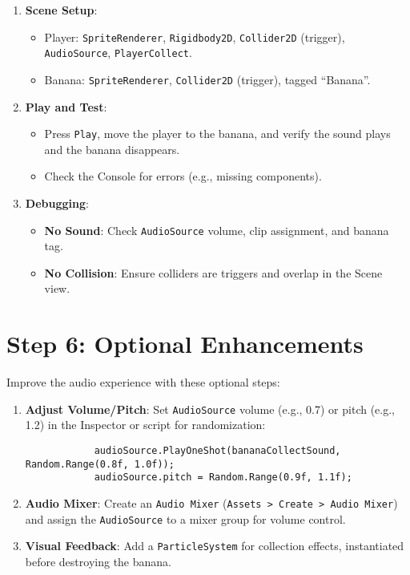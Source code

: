 \documentclass[a4paper,12pt]{article}
\begin{document}
	\begin{enumerate}[label=\arabic*.]
		\item \textbf{Scene Setup}:
		\begin{itemize}
			\item Player: \texttt{SpriteRenderer}, \texttt{Rigidbody2D}, \texttt{Collider2D} (trigger), \texttt{AudioSource}, \texttt{PlayerCollect}.
			\item Banana: \texttt{SpriteRenderer}, \texttt{Collider2D} (trigger), tagged ``Banana''.
		\end{itemize}
		\item \textbf{Play and Test}:
		\begin{itemize}
			\item Press \texttt{Play}, move the player to the banana, and verify the sound plays and the banana disappears.
			\item Check the Console for errors (e.g., missing components).
		\end{itemize}
		\item \textbf{Debugging}:
		\begin{itemize}
			\item \textbf{No Sound}: Check \texttt{AudioSource} volume, clip assignment, and banana tag.
			\item \textbf{No Collision}: Ensure colliders are triggers and overlap in the Scene view.
		\end{itemize}
	\end{enumerate}
	
	\section{Step 6: Optional Enhancements}
	Improve the audio experience with these optional steps:
	
	\begin{enumerate}[label=\arabic*.]
		\item \textbf{Adjust Volume/Pitch}: Set \texttt{AudioSource} volume (e.g., 0.7) or pitch (e.g., 1.2) in the Inspector or script for randomization:
		\begin{lstlisting}
			audioSource.PlayOneShot(bananaCollectSound, Random.Range(0.8f, 1.0f));
			audioSource.pitch = Random.Range(0.9f, 1.1f);
		\end{lstlisting}
		\item \textbf{Audio Mixer}: Create an \texttt{Audio Mixer} (\texttt{Assets > Create > Audio Mixer}) and assign the \texttt{AudioSource} to a mixer group for volume control.
		\item \textbf{Visual Feedback}: Add a \texttt{ParticleSystem} for collection effects, instantiated before destroying the banana.
	\end{enumerate}
	
\end{document}
